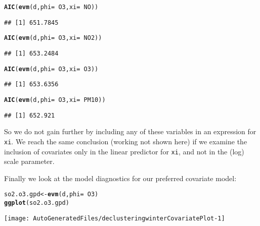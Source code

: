 \documentclass[10pt]{article}\usepackage[]{graphicx}\usepackage[]{color}
\makeatletter
\def\maxwidth{ %
  \ifdim\Gin@nat@width>\linewidth
    \linewidth
  \else
    \Gin@nat@width
  \fi
}
\newcommand{\hlopt}[1]{\textcolor[rgb]{0,0,0}{#1}}%
\newcommand{\hlstd}[1]{\textcolor[rgb]{0.345,0.345,0.345}{#1}}%
\newcommand{\hlkwb}[1]{\textcolor[rgb]{0.69,0.353,0.396}{#1}}%
\newcommand{\hlkwc}[1]{\textcolor[rgb]{0.333,0.667,0.333}{#1}}%
\newcommand{\hlkwd}[1]{\textcolor[rgb]{0.737,0.353,0.396}{\textbf{#1}}}%
\newenvironment{kframe}{%
 \def\at@end@of@kframe{}%
 \ifinner\ifhmode%
  \def\at@end@of@kframe{\end{minipage}}%
  \begin{minipage}{\columnwidth}%
 \fi\fi%
 \def\FrameCommand##1{\hskip\@totalleftmargin \hskip-\fboxsep
 \colorbox{shadecolor}{##1}\hskip-\fboxsep
     \hskip-\linewidth \hskip-\@totalleftmargin \hskip\columnwidth}%
 \MakeFramed {\advance\hsize-\width
   \@totalleftmargin\z@ \linewidth\hsize
   \@setminipage}}%
 {\par\unskip\endMakeFramed%
 \at@end@of@kframe}
\newenvironment{knitrout}{}{} %
\makeatother
\begin{document}
\begin{knitrout}
\color{fgcolor}\begin{kframe}
\begin{alltt}
\hlkwd{AIC}\hlstd{(}\hlkwd{evm}\hlstd{(d,}\hlkwc{phi}\hlstd{=}\hlopt{~}\hlstd{O3,}\hlkwc{xi}\hlstd{=}\hlopt{~}\hlstd{NO))}
\end{alltt}
\begin{verbatim}
## [1] 651.7845
\end{verbatim}
\begin{alltt}
\hlkwd{AIC}\hlstd{(}\hlkwd{evm}\hlstd{(d,}\hlkwc{phi}\hlstd{=}\hlopt{~}\hlstd{O3,}\hlkwc{xi}\hlstd{=}\hlopt{~}\hlstd{NO2))}
\end{alltt}
\begin{verbatim}
## [1] 653.2484
\end{verbatim}
\begin{alltt}
\hlkwd{AIC}\hlstd{(}\hlkwd{evm}\hlstd{(d,}\hlkwc{phi}\hlstd{=}\hlopt{~}\hlstd{O3,}\hlkwc{xi}\hlstd{=}\hlopt{~}\hlstd{O3))}
\end{alltt}
\begin{verbatim}
## [1] 653.6356
\end{verbatim}
\begin{alltt}
\hlkwd{AIC}\hlstd{(}\hlkwd{evm}\hlstd{(d,}\hlkwc{phi}\hlstd{=}\hlopt{~}\hlstd{O3,}\hlkwc{xi}\hlstd{=}\hlopt{~}\hlstd{PM10))}
\end{alltt}
\begin{verbatim}
## [1] 652.921
\end{verbatim}
\end{kframe}
\end{knitrout}

So we do not gain further by including any of these variables in an expression for {\tt xi}.  We reach the same conclusion (working not shown here) if we examine the inclusion of covariates only in the linear predictor for {\tt xi}, and not in the (log) scale parameter.

Finally we look at the model diagnostics for our preferred covariate model:

\begin{knitrout}
\color{fgcolor}\begin{kframe}
\begin{alltt}
\hlstd{so2.o3.gpd} \hlkwb{<-} \hlkwd{evm}\hlstd{(d,}\hlkwc{phi}\hlstd{=}\hlopt{~}\hlstd{O3)}
\hlkwd{ggplot}\hlstd{(so2.o3.gpd)}
\end{alltt}
\end{kframe}
\texttt{[image: AutoGeneratedFiles/declusteringwinterCovariatePlot-1]} 

\end{knitrout}
\end{document}
